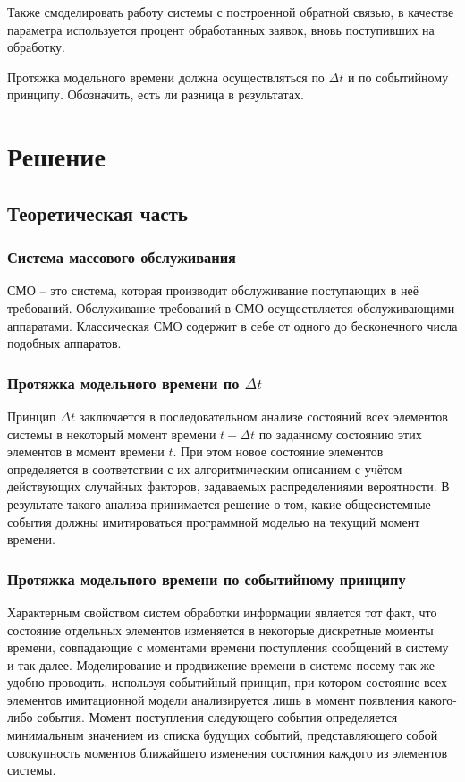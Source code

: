 \documentclass[14pt]{extreport}
\begin{document}
Также смоделировать работу системы с построенной обратной связью, в качестве параметра используется процент обработанных заявок, вновь поступивших на обработку.

Протяжка модельного времени должна осуществляться по $\Delta t$ и по событийному принципу. Обозначить, есть ли разница в результатах. 

\chapter{Решение}
\section{Теоретическая часть}

\subsection{Система массового обслуживания}

СМО -- это система, которая производит обслуживание поступающих в неё требований. Обслуживание требований в СМО осуществляется обслуживающими аппаратами. Классическая СМО содержит в себе от одного до бесконечного числа подобных аппаратов.

\subsection{Протяжка модельного времени по $\Delta t$}

Принцип $\Delta t$ заключается в последовательном анализе состояний всех элементов системы в некоторый момент времени $t + \Delta t$ по заданному состоянию этих элементов в момент времени $t$. При этом новое состояние элементов определяется в соответствии с их алгоритмическим описанием с учётом действующих случайных факторов, задаваемых распределениями вероятности. В результате такого анализа принимается решение о том, какие общесистемные события должны имитироваться программной моделью на текущий момент времени.

\subsection{Протяжка модельного времени по событийному принципу}

Характерным свойством систем обработки информации является тот факт, что состояние отдельных элементов изменяется в некоторые дискретные моменты времени, совпадающие с моментами времени поступления сообщений в систему и так далее. Моделирование и продвижение времени в системе посему так же удобно проводить, используя событийный принцип, при котором состояние всех элементов имитационной модели анализируется лишь в момент появления какого-либо события. Момент поступления следующего события определяется минимальным значением из списка будущих событий, представляющего собой совокупность моментов ближайшего изменения состояния каждого из элементов системы.
\end{document}
